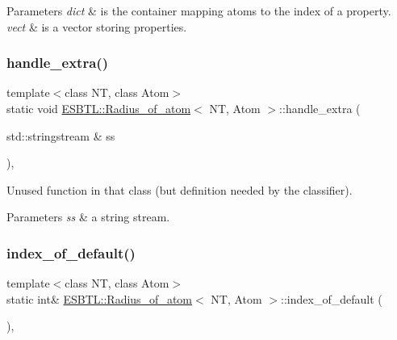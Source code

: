 \begin{DoxyParams}{Parameters}
{\em dict} & is the container mapping atoms to the index of a property. \\
\hline
{\em vect} & is a vector storing properties. \\
\hline
\end{DoxyParams}
\mbox{\label{classESBTL_1_1Radius__of__atom_a0b50c09fef4c70675661c4a35e4a23f1}} 
\subsubsection{\texorpdfstring{handle\+\_\+extra()}{handle\_extra()}}
{\footnotesize\ttfamily template$<$class NT, class Atom$>$ \\
static void \hyperlink{classESBTL_1_1Radius__of__atom}{E\+S\+B\+T\+L\+::\+Radius\+\_\+of\+\_\+atom}$<$ NT, Atom $>$\+::handle\+\_\+extra (\begin{DoxyParamCaption}\item[{std\+::stringstream \&}]{ss }\end{DoxyParamCaption})\hspace{0.3cm}{\ttfamily [inline]}, {\ttfamily [static]}}

Unused function in that class (but definition needed by the classifier). 
\begin{DoxyParams}{Parameters}
{\em ss} & a string stream. \\
\hline
\end{DoxyParams}
\mbox{\label{classESBTL_1_1Radius__of__atom_a017cf5493434a9cc5030078140571b1a}} 
\subsubsection{\texorpdfstring{index\+\_\+of\+\_\+default()}{index\_of\_default()}}
{\footnotesize\ttfamily template$<$class NT, class Atom$>$ \\
static int\& \hyperlink{classESBTL_1_1Radius__of__atom}{E\+S\+B\+T\+L\+::\+Radius\+\_\+of\+\_\+atom}$<$ NT, Atom $>$\+::index\+\_\+of\+\_\+default (\begin{DoxyParamCaption}{ }\end{DoxyParamCaption})\hspace{0.3cm}{\ttfamily [inline]}, {\ttfamily [static]}}

